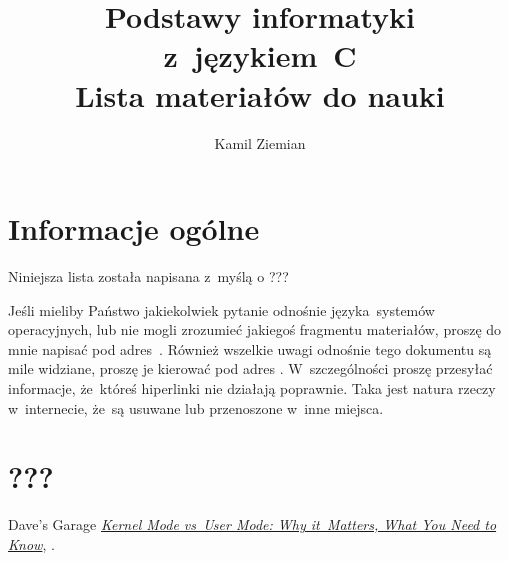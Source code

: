 \documentclass[a4paper,11pt]{article}
\title{Podstawy informatyki z~językiem~C \\
  {\Large Lista materiałów do nauki}}
\author{Kamil Ziemian \\
  \email}
\begin{document}





\maketitle





\section{Informacje ogólne}

\label{sec:Informacje-ogólne}


Niniejsza lista została napisana z~myślą o ???%

Jeśli mieliby Państwo jakiekolwiek pytanie odnośnie języka~systemów
operacyjnych, lub nie mogli zrozumieć jakiegoś fragmentu materiałów,
proszę do mnie napisać pod adres~\email. Również wszelkie uwagi odnośnie
tego dokumentu są mile widziane, proszę je kierować pod adres \email.
W~szczególności proszę przesyłać informacje, że~któreś hiperlinki nie
działają poprawnie. Taka jest natura rzeczy w~internecie, że~są usuwane lub
przenoszone w~inne miejsca.










\section{???}

\label{sec:Informacje-ogólne}


Dave’s Garage \href{https://www.youtube.com/watch?v=GB7JTXeGcs0}
{\textit{Kernel Mode vs~User Mode: Why it~Matters, What You Need to Know}},
\parencite{Daves-Garage-Kernel-Mode-vs-User-Mode-Why-it-ETC-Ver-2024}.












\printbibliography






\end{document}
